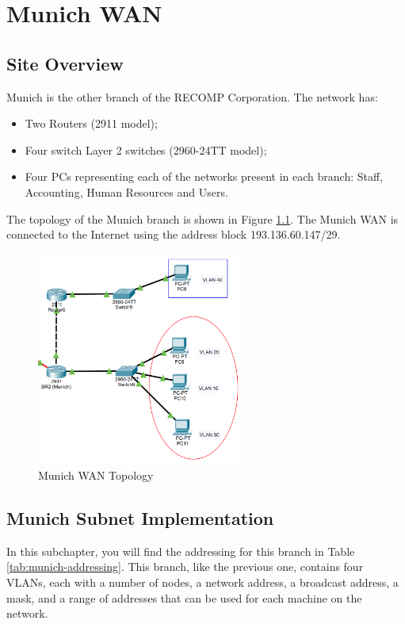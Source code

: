 \chapter{Munich WAN}

\section{Site Overview}
Munich is the other branch of the RECOMP Corporation. The network has:
\begin{itemize}
    \item Two Routers (2911 model);
    \item Four switch Layer 2 switches (2960-24TT model);
    \item Four PCs representing each of the networks present in each branch: Staff, Accounting, Human Resources and Users.
\end{itemize}

The topology of the Munich branch is shown in Figure \ref{fig:munichtopology}. The Munich \ac{WAN} is connected to the Internet using the address block 193.136.60.147/29.

\begin{figure}[!htb]
\centering
\includegraphics[width=0.6\textwidth]{figures/munich_topology.png}
\caption{\label{fig:munichtopology}Munich WAN Topology}
\end{figure}


\section{Munich Subnet Implementation}

In this subchapter, you will find the addressing for this branch in Table \ref{tab:munich-addressing}. This branch, like the previous one, contains four VLANs, each with a number of nodes, a network address, a broadcast address, a mask, and a range of addresses that can be used for each machine on the network.

